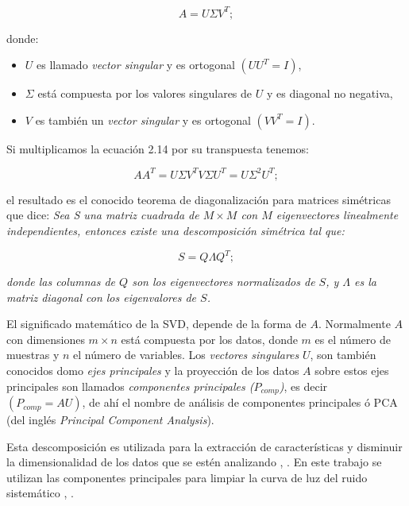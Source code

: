 \begin{equation}
  \displaystyle A=U\Sigma V^{T};
\end{equation}

\noindent donde:\\

\begin{itemize}
  \item $U$ es llamado \textit{vector singular} y es ortogonal $(UU^{T}=I)$,
  \item $\Sigma$ está compuesta por los valores singulares de $U$ y es diagonal no negativa,
  \item $V$ es también un \textit{vector singular} y es ortogonal $(VV^{T}=I)$.
\end{itemize}

Si multiplicamos la ecuación 2.14 por su transpuesta tenemos:

\begin{equation}
  \displaystyle AA^{T}=U\Sigma V^{T} V\Sigma U^{T} = U \Sigma^{2} U^{T};
\end{equation}

\noindent el resultado es el conocido teorema de diagonalización para matrices simétricas que dice: \textit{Sea S una matriz cuadrada de $M\times M$ con $M$ eigenvectores linealmente independientes, entonces existe una descomposición simétrica tal que:}

\begin{equation*}
  \displaystyle S=Q\Lambda Q^{T};
\end{equation*}


\noindent \textit{donde las columnas de $Q$ son los eigenvectores normalizados de $S$, y $\Lambda$ es la matriz diagonal con los eigenvalores de $S$.}

El significado matemático de la SVD, depende de la forma de $A$. Normalmente $A$ con dimensiones $m\times n$ está compuesta por los datos, donde $m$ es el número de muestras y $n$ el número de variables. Los \textit{vectores singulares} $U$, son también conocidos domo \textit{ejes principales} y la proyección de los datos $A$ sobre estos ejes principales son llamados \textit{componentes principales ($P_{comp}$)}, es decir $(P_{comp}=AU)$, de ahí el nombre de análisis de componentes principales ó PCA (del inglés \textit{Principal Component Analysis}).

Esta descomposición es utilizada para la extracción de características y disminuir la dimensionalidad de los datos que se estén analizando \cite{mcgurk2010principal}, \cite{medeiros2018principal}. En este trabajo se utilizan las componentes principales para limpiar la curva de luz del ruido sistemático \cite{shin1999iterative}, \cite{bailey2012principal}.